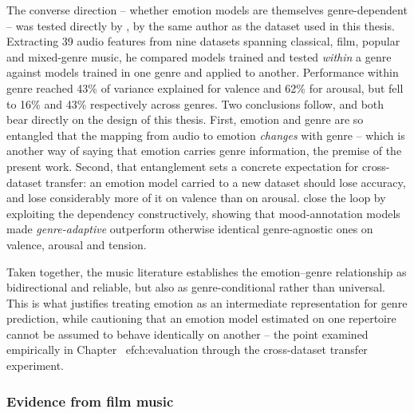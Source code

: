 The converse direction -- whether emotion models are themselves genre-dependent -- was
tested directly by \citet{eerola2011genrespecific}, by the same author as the dataset used
in this thesis. Extracting 39 audio features from nine datasets spanning classical, film,
popular and mixed-genre music, he compared models trained and tested \emph{within} a
genre against models trained in one genre and applied to another. Performance within
genre reached 43\% of variance explained for valence and 62\% for arousal, but fell to
16\% and 43\% respectively across genres. Two conclusions follow, and both bear directly
on the design of this thesis. First, emotion and genre are so entangled that the mapping
from audio to emotion \emph{changes} with genre -- which is another way of saying that
emotion carries genre information, the premise of the present work. Second, that
entanglement sets a concrete expectation for cross-dataset transfer: an emotion model
carried to a new dataset should lose accuracy, and lose considerably more of it on valence
than on arousal. \citet{saari2016genre} close the loop by exploiting the dependency
constructively, showing that mood-annotation models made \emph{genre-adaptive} outperform
otherwise identical genre-agnostic ones on valence, arousal and tension.

Taken together, the music literature establishes the emotion--genre relationship as
bidirectional and reliable, but also as genre-conditional rather than universal. This is
what justifies treating emotion as an intermediate representation for genre prediction,
while cautioning that an emotion model estimated on one repertoire cannot be assumed to
behave identically on another -- the point examined empirically in
Chapter~
ef{ch:evaluation} through the cross-dataset transfer experiment.

\subsubsection*{Evidence from film music}

